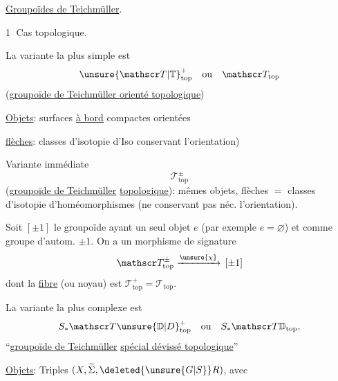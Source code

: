 
\uline{Groupoïdes de Teichmüller}.

\textcircled{1} Cas topologique.

La variante la plus simple est
\[
{\unsure{\mathscr T|\mathbb T}}_{\mathrm{top}}^{+}\quad\text{ou}\quad\mathscr T_{\mathrm{top}}
\]
(\uline{groupoïde de Teichmüller \uline{orienté} topologique})


\uline{Objets}: surfaces \uline{à bord} compactes orientées

\uline{flèches}: classes d'isotopie d'Iso conservant l'orientation)

Variante immédiate
\[
\mathscr T_{\mathrm{top}}^{\pm}
\]
(\uline{groupoïde de Teichmüller}  \uline{topologique}): mêmes objets, flèches $=$  classes d'isotopie d'homéomorphismes (ne conservant pas néc. l'orientation).

Soit $[\pm1]$ le groupoïde ayant un seul objet $e$ (par exemple $e=\varnothing$) et comme groupe d'autom. $\pm1$. On a un morphisme de signature
\[
\mathscr T_{\mathrm{top}}^{\pm}\xrightarrow{\unsure{\chi}}\,[\pm1]
\]
dont la \uline{fibre}  (ou noyau) est $\mathscr T_{\mathrm{top}}^{+}=\mathscr T_{\mathrm{top}}$.


La variante la plus complexe est
\[
S_{*}\mathscr T{\unsure{\mathbb D|D}}_{\mathrm{top}}^{+}\quad\text{ou}\quad S_{*}\mathscr T\mathbb D_{\mathrm{top}},
\]
``\uline{groupoïde de Teichmüller}  \uline{spécial dévissé topologique}''



\uline{Objets}: Triples $(X,\widetilde\Sigma,\deleted{\unsure{G|S}}R)$, avec


